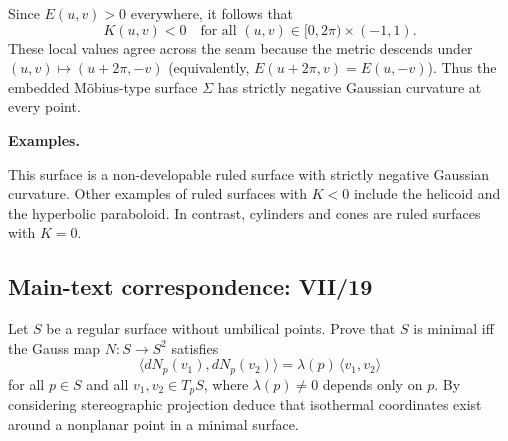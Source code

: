 \begin{solution}
Since $E(u,v)>0$ everywhere, it follows that
\[
K(u,v)<0\quad\text{for all }(u,v)\in[0,2\pi)\times(-1,1).
\]
These local values agree across the seam because the metric descends
under $(u,v)\mapsto(u+2\pi,-v)$ (equivalently,
$E(u+2\pi,v)=E(u,-v)$).  Thus the embedded M\"obius-type
surface $\Sigma$ has strictly negative Gaussian curvature at every point.

\par\medskip\noindent\textbf{Examples.}\par\smallskip

This surface is a non-developable ruled surface with strictly negative
Gaussian curvature.  Other examples of ruled surfaces with $K<0$ include
the helicoid and the hyperbolic paraboloid.  In contrast, cylinders and
cones are ruled surfaces with $K=0$.
\end{solution}

\subsection*{Main-text correspondence: VII/19}

\begin{problem}
\label{prob:cp-vii-0055}
Let $S$ be a regular surface without umbilical points. Prove that $S$ is minimal iff the Gauss map
	$N:S\to S^2$ satisfies
	\[
	\langle dN_p(v_1), dN_p(v_2)\rangle = \lambda(p)\,\langle v_1,v_2\rangle
	\]
	for all $p\in S$ and all $v_1,v_2\in T_pS$, where $\lambda(p)\neq 0$ depends only on $p$.
	By considering stereographic projection deduce that isothermal coordinates exist around a nonplanar point
	in a minimal surface.
	
	\medskip
\end{problem}

